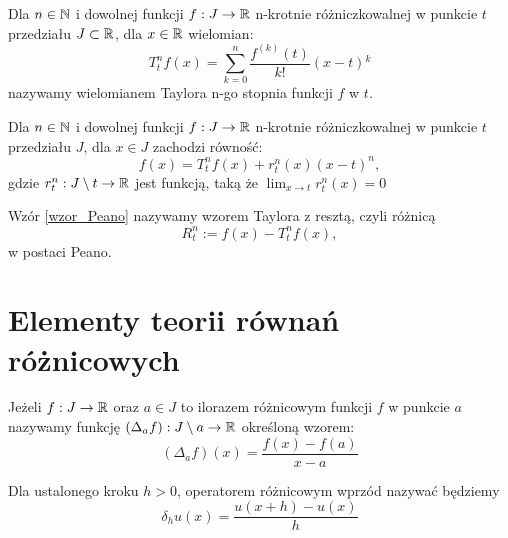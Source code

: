 \documentclass[12pt,a4paper]{report}
\begin{document}

\begin{definition}
Dla $ n \in \mathbb{N} $ i dowolnej funkcji $ f: J \to \mathbb{R} $ n-krotnie różniczkowalnej w punkcie $t$ przedziału $ J \subset \mathbb{R} $, dla $x \in \mathbb{R} $  wielomian: 
\begin{equation}
T_{t}^{n}f(x) = \sum_{k=0}^{n} \frac{f^{(k)}(t)}{k!} (x-t){^k}  
\end{equation}
nazywamy wielomianem Taylora n-go stopnia funkcji $f$ w $t$.
\end{definition}

\begin{theorem} \label{wzor_Peano}
Dla $n \in \mathbb{N}$ i dowolnej funkcji $ f: J \to \mathbb{R} $ n-krotnie różniczkowalnej w punkcie $t$ przedziału $J$, dla $x \in J$ zachodzi równość:
\begin{equation}
f(x) = T_{t}^{n}f(x) + r_{t}^{n}(x)(x-t)^n ,
\end{equation}
gdzie $r_{t}^{n} : J \setminus t \to \mathbb{R} $ jest funkcją, taką że $ \lim_{x \to t} r_{t}^{n}(x) = 0 $
\end{theorem}
\begin{definition}
Wzór \ref{wzor_Peano} nazywamy wzorem Taylora z resztą, czyli różnicą 
$$
R_{t}^{n} := f(x) - T_{t}^{n}f(x), 
$$
w postaci Peano. 
\end{definition}


\section{Elementy teorii równań różnicowych}
 
\begin{definition}
Jeżeli $ f: J \to \mathbb{R} $ oraz $ a \in J$ to ilorazem różnicowym funkcji $f$ w punkcie $a$ nazywamy funkcję $ (\Delta_{a}f) : J \setminus a \to \mathbb{R} $ określoną wzorem: 
$$
(\Delta_{a}f)(x) = \frac{f(x) - f(a)}{x-a}
$$
\end{definition}
\begin{definition}\label{operator_wporzd}
Dla ustalonego kroku $h>0 $, operatorem różnicowym wprzód nazywać będziemy 
$$
\delta_h u(x) = \frac{u(x+h) - u(x)}{h}
$$
\end{definition}
\end{document}
